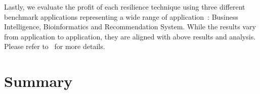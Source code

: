 Lastly, we evaluate 
the profit of each resilience technique using three different
benchmark applications representing a wide range of
application~\cite{mrbs}: Business Intelligence, Bioinformatics and
Recommendation System. While the results vary from application to application, they are aligned with above results and analysis. Please refer to~\cite{cui_2014_closer} for more details.
%
%	
%
%

\section{Summary}

